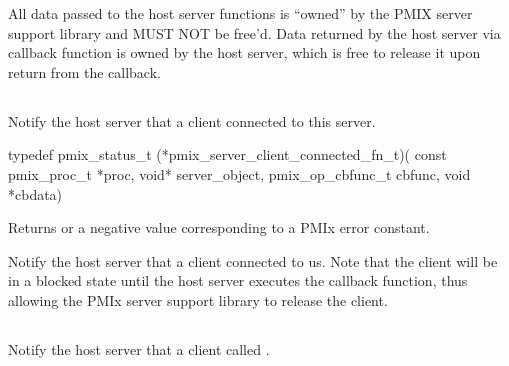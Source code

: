 All data passed to the host server functions is ``owned'' by the PMIX server support library and MUST NOT be free'd.
Data returned by the host server via callback function is owned by the host server, which is free to release it upon return from the callback.



\subsection{}

\summary

Notify the host server that a client connected to this server.

\format

\cspecificstart
\begin{codepar}
typedef pmix_status_t (*pmix_server_client_connected_fn_t)(
                             const pmix_proc_t *proc, void* server_object,
                             pmix_op_cbfunc_t cbfunc, void *cbdata)
\end{codepar}
\cspecificend

\begin{arglist}
\end{arglist}

Returns  or a negative value corresponding to a PMIx error constant.

\descr

Notify the host server that a client connected to us.
Note that the client will be in a blocked state until the host server executes the callback function, thus allowing the PMIx server support library to release the client.


\subsection{}

\summary

Notify the host server that a client called .


